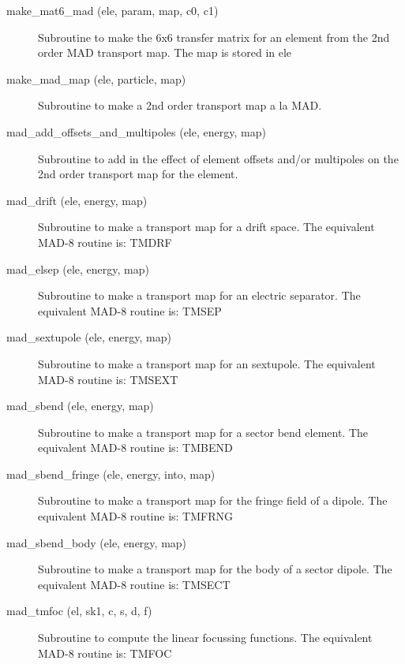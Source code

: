 \begin{description}

\item[make\_mat6\_mad (ele, param, map, c0, c1)] \Newline 
     Subroutine to make the 6x6 transfer matrix for an element from the 
     2nd order MAD transport map. The map is stored in ele%

\item[make\_mad\_map (ele, particle, map)] \Newline 
     Subroutine to make a 2nd order transport map a la MAD.

\item[mad\_add\_offsets\_and\_multipoles (ele, energy, map)] \Newline 
     Subroutine to add in the effect of element offsets and/or multipoles
     on the 2nd order transport map for the element.

\item[mad\_drift (ele, energy, map)] \Newline 
     Subroutine to make a transport map for a drift space.
     The equivalent MAD-8 routine is: TMDRF

\item[mad\_elsep (ele, energy, map)] \Newline 
     Subroutine to make a transport map for an electric separator. 
     The equivalent MAD-8 routine is: TMSEP

\item[mad\_sextupole (ele, energy, map)] \Newline 
     Subroutine to make a transport map for an sextupole.
     The equivalent MAD-8 routine is: TMSEXT

\item[mad\_sbend (ele, energy, map)] \Newline 
     Subroutine to make a transport map for a sector bend element.
     The equivalent MAD-8 routine is: TMBEND

\item[mad\_sbend\_fringe (ele, energy, into, map)] \Newline 
     Subroutine to make a transport map for the fringe field of a dipole.
     The equivalent MAD-8 routine is: TMFRNG

\item[mad\_sbend\_body (ele, energy, map)] \Newline 
     Subroutine to make a transport map for the body of a sector dipole.
     The equivalent MAD-8 routine is: TMSECT

\item[mad\_tmfoc (el, sk1, c, s, d, f) ] \Newline 
     Subroutine to compute the linear focussing functions.  
     The equivalent MAD-8 routine is: TMFOC


\end{description}
